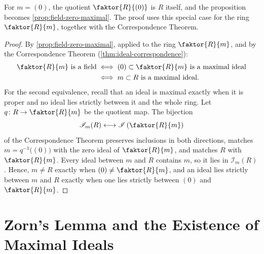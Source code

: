 
For $m = (0)$, the quotient $\faktor{R}{(0)}$ is $R$ itself, and the proposition becomes \cref{prop:field-zero-maximal}. The proof uses this special case for the ring $\faktor{R}{m}$, together with the Correspondence Theorem.

\begin{proof}
By \cref{prop:field-zero-maximal}, applied to the ring $\faktor{R}{m}$, and by the Correspondence Theorem (\cref{thm:ideal-correspondence}):
\begin{align*}
\faktor{R}{m} \text{ is a field} &\iff (0) \subset \faktor{R}{m} \text{ is a maximal ideal} \\
&\iff m \subset R \text{ is a maximal ideal}.
\end{align*}
For the second equivalence, recall that an ideal is maximal exactly when it is proper and no ideal lies strictly between it and the whole ring. Let $q \colon R \to \faktor{R}{m}$ be the quotient map. The bijection
\[
\mathscr{I}_m(R) \longleftrightarrow \mathscr{I}\left(\faktor{R}{m}\right)
\]
of the Correspondence Theorem preserves inclusions in both directions, matches $m = q^{-1}\bigl((0)\bigr)$ with the zero ideal of $\faktor{R}{m}$, and matches $R$ with $\faktor{R}{m}$. Every ideal between $m$ and $R$ contains $m$, so it lies in $\mathscr{I}_m(R)$. Hence, $m \neq R$ exactly when $(0) \neq \faktor{R}{m}$, and an ideal lies strictly between $m$ and $R$ exactly when one lies strictly between $(0)$ and $\faktor{R}{m}$.
\end{proof}


\section{Zorn's Lemma and the Existence of Maximal Ideals}\label{sec:zorn}

